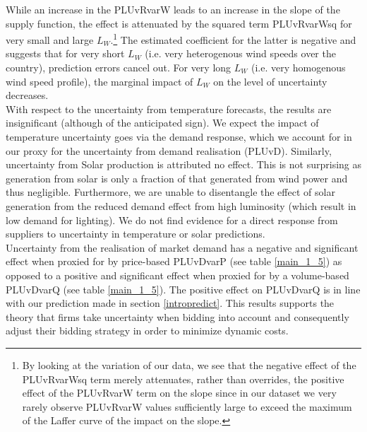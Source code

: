 While an increase in the PLUvRvarW leads to an increase in the slope of the supply function, the effect is attenuated by the squared term PLUvRvarWsq 
for very small and large $L_W$.\footnote{By looking at the variation of our data, we see that the negative effect of the PLUvRvarWsq term merely attenuates, rather than overrides, the positive effect of the PLUvRvarW term on the slope since in our dataset we very rarely observe PLUvRvarW values sufficiently large to exceed the maximum of the Laffer curve of the impact on the slope.} The estimated coefficient for the latter is negative and suggests that for very short $L_W$ (i.e. very heterogenous wind speeds over the country), prediction errors cancel out. For very long $L_W$ (i.e. very homogenous wind speed profile), the marginal impact of $L_W$ on the level of uncertainty decreases. \\


With respect to the uncertainty from temperature forecasts, the results are insignificant (although of the anticipated sign). We expect the impact of temperature uncertainty goes via the demand response, which we account for in our proxy for the uncertainty from demand realisation (PLUvD). Similarly, uncertainty from Solar production is attributed no effect. This is not surprising as 
generation from solar is only a fraction of that generated from wind power and thus negligible.
Furthermore, we are unable to disentangle the effect of solar generation from the reduced demand effect from high luminosity (which result in low demand for lighting). We do not find evidence for a direct response from suppliers to uncertainty in temperature or solar predictions. \\

Uncertainty from the realisation of market demand has a negative and significant effect when proxied for by price-based PLUvDvarP (see table \ref{main_1_5}) as opposed to a positive and significant effect when proxied for by a volume-based PLUvDvarQ (see table \ref{main_1_5}). 
The positive effect on PLUvDvarQ is in line with our prediction made in section \ref{intropredict}. This results supports the theory that firms take uncertainty when bidding into account and consequently adjust their bidding strategy in order to minimize dynamic costs. \\

